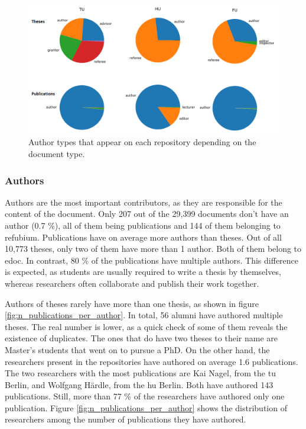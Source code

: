 \begin{figure}
    \centering
    \includegraphics[width=\textwidth]{figures/repository_analysis/author_types_pretty.png}
    \caption{Author types that appear on each repository depending on the document type.}
    \label{fig:author_types}
\end{figure}


\subsubsection{Authors}

Authors are the most important contributors, as they are responsible for the content of the document. Only 207 out of the 29,399 documents don't have an author (0.7 \%), all of them being publications and 144 of them belonging to refubium. Publications have on average more authors than theses. Out of all 10,773 theses, only two of them have more than 1 author. Both of them belong to edoc. In contrast, 80 \% of the publications have multiple authors. This difference is expected, as students are usually required to write a thesis by themselves, whereas researchers often collaborate and publish their work together.

Authors of theses rarely have more than one thesis, as shown in figure \ref{fig:n_publications_per_author}. In total, 56 alumni have authored multiple theses. The real number is lower, as a quick check of some of them reveals the existence of duplicates. The ones that do have two theses to their name are Master's students that went on to pursue a PhD. On the other hand, the researchers present in the repositories have authored on average 1.6 publications. The two researchers with the most publications are Kai Nagel, from the \acrshort{tu} Berlin, and Wolfgang Härdle, from the \acrshort{hu} Berlin. Both have authored 143 publications. Still, more than 77 \% of the researchers have authored only one publication. Figure \ref{fig:n_publications_per_author} shows the distribution of researchers among the number of publications they have authored.

